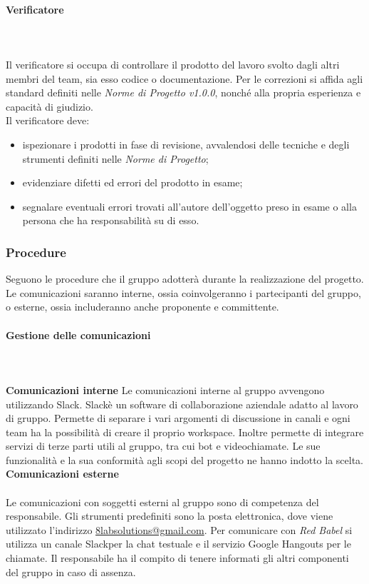 			\paragraph{Verificatore} \mbox{}\\ \mbox{}\\
			Il verificatore si occupa di controllare il prodotto del lavoro svolto dagli altri membri del team, sia esso codice o documentazione. Per le correzioni si affida agli standard definiti nelle \textit{Norme di Progetto v1.0.0}, nonché alla propria esperienza e capacità di giudizio.\\
			Il verificatore deve:
			\begin{itemize}
				\item ispezionare i prodotti in fase di revisione, avvalendosi delle tecniche e degli strumenti definiti nelle \textit{Norme di Progetto};
				\item evidenziare difetti ed errori del prodotto in esame;
				\item segnalare eventuali errori trovati all'autore dell'oggetto preso in esame o alla persona che ha responsabilità su di esso.
			\end{itemize}
		\subsubsection{Procedure}

		Seguono le procedure che il gruppo adotterà durante la realizzazione del progetto. Le comunicazioni saranno interne, ossia coinvolgeranno i partecipanti del gruppo, o esterne, ossia includeranno anche proponente e committente.
			\paragraph{Gestione delle comunicazioni} \mbox{}\\ \mbox{}\\
			\textbf{Comunicazioni interne} \newline \newline
			Le comunicazioni interne al gruppo avvengono utilizzando Slack\glo. Slack\glosp è un software di collaborazione aziendale adatto al lavoro di gruppo. Permette di separare i vari argomenti di discussione in canali e ogni team ha la possibilità di creare il proprio workspace. Inoltre permette di integrare servizi di terze parti utili al gruppo, tra cui bot e videochiamate. Le sue funzionalità e la sua conformità agli scopi del progetto ne hanno indotto la scelta. \newline \newline
			\textbf{Comunicazioni esterne} \mbox{}\\ \mbox{}\\
			Le comunicazioni con soggetti esterni al gruppo sono di competenza del responsabile. Gli strumenti predefiniti sono la posta elettronica, dove viene utilizzato l'indirizzo \href{mailto:8labsolutions@gmail.com}{8labsolutions@gmail.com}.
			Per comunicare con \textit{Red Babel} si utilizza un canale Slack\glosp per la chat testuale e il servizio Google Hangouts per le chiamate. Il responsabile ha il compito di tenere informati gli altri componenti del gruppo in caso di assenza.
			\newline
